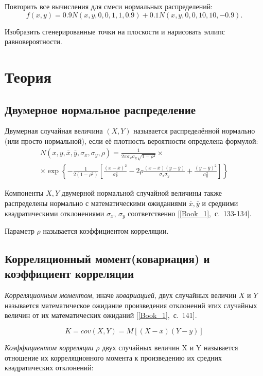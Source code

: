 \documentclass[12pt,a4paper]{article}
\begin{document}
	Повторить все вычисления для смеси нормальных распределений:
	$$f(x, y) = 0.9N(x, y, 0, 0, 1, 1, 0.9) + 0.1N(x, y, 0, 0, 10, 10, -0.9).$$
	
	Изобразить сгенерированные точки на плоскости и нарисовать эллипс равновероятности.
	
	\section{Теория}
	\subsection{Двумерное нормальное распределение}
	Двумерная случайная величина $(X, Y)$ называется распределённой нормально (или просто нормальной), если её плотность вероятности определена
	формулой:
	\begin{multline}\label{eqn:multivariate_normal}
	N(x, y, \overline{x}, \overline{y}, \sigma_x, \sigma_y, \rho) = \frac{1}{2\pi\sigma_x\sigma_y\sqrt{1 - \rho^2}} \times\\
	\times \exp\left\{
	-\frac{1}{2(1 - \rho^2)} \left[\frac{(x - \overline{x})^2}{\sigma^2_x} - 2\rho\frac{(x - \overline{x})(y - \overline{y})}{\sigma_x \sigma_y} + \frac{(y - \overline{y})^2}{\sigma^2_y}\right]
	\right\}
	\end{multline}
	
	Компоненты $X, Y$ двумерной нормальной случайной величины также распределены нормально с математическими ожиданиями $\overline{x}, \overline{y}$ и средними квадратическими отклонениями $\sigma_x$, $\sigma_y$ соответственно [\ref{Book_1},~с.~133-134].
	
	Параметр $\rho$ называется коэффициентом корреляции.
	
	\subsection{Корреляционный момент(ковариация) и коэффициент корреляции}
	\emph{Корреляционным моментом}, иначе \emph{ковариацией}, двух случайных величин $X$ и $Y$ называется математическое ожидание произведения отклонений этих случайных величин от их математических ожиданий [\ref{Book_1},~с.~141].
	
	\begin{equation}\label{eqn:cor_moment}
	K = cov(X, Y) = M[(X - \overline{x})(Y - \overline{y})]
	\end{equation}
	
	\emph{Коэффициентом корреляции} $\rho$ двух случайных величин X и Y называется отношение их корреляционного момента к произведению их средних квадратических отклонений:
	
\end{document}
